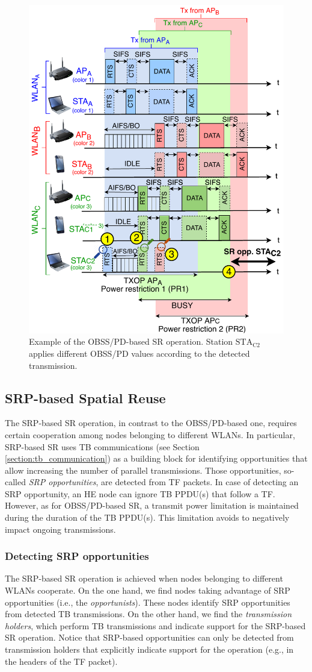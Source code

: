 \documentclass[preprint,12pt]{elsarticle}
\begin{document}
	\begin{figure}[ht!]
		\centering
		\includegraphics[width=0.5\columnwidth]{fig_12}
		\caption{Example of the OBSS/PD-based SR operation. Station $\text{STA}_\text{C2}$ applies different OBSS/PD values according to the detected transmission.}
		\label{fig:fig_12}
	\end{figure}
	
	\subsection{SRP-based Spatial Reuse}
	\label{section:srp_based}	
	The SRP-based SR operation, in contrast to the OBSS/PD-based one, requires certain cooperation among nodes belonging to different WLANs. In particular, SRP-based SR uses TB communications (see Section \ref{section:tb_communication}) as a building block for identifying opportunities that allow increasing the number of parallel transmissions. Those opportunities, so-called \emph{SRP opportunities}, are detected from TF packets. In case of detecting an SRP opportunity, an HE node can ignore TB PPDU(s) that follow a TF. However, as for OBSS/PD-based SR, a transmit power limitation is maintained during the duration of the TB PPDU(s). This limitation avoids to negatively impact ongoing transmissions.
	
	\subsubsection{Detecting SRP opportunities}
	The SRP-based SR operation is achieved when nodes belonging to different WLANs cooperate. On the one hand, we find nodes taking advantage of SRP opportunities (i.e., the \emph{opportunists}). These nodes identify SRP opportunities from detected TB transmissions. On the other hand, we find the \emph{transmission holders}, which perform TB transmissions and indicate support for the SRP-based SR operation. Notice that SRP-based opportunities can only be detected from transmission holders that explicitly indicate support for the operation (e.g., in the headers of the TF packet).
	
\end{document}
